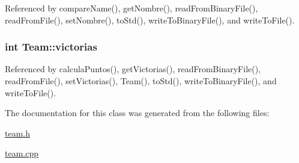Referenced by compare\+Name(), get\+Nombre(), read\+From\+Binary\+File(), read\+From\+File(), set\+Nombre(), to\+Std(), write\+To\+Binary\+File(), and write\+To\+File().

\hypertarget{class_team_ab6444e3430b98ec88a91a841ee7788d8}{}
\subsubsection[{victorias}]{\setlength{\rightskip}{0pt plus 5cm}int Team\+::victorias\hspace{0.3cm}{\ttfamily [private]}}\label{class_team_ab6444e3430b98ec88a91a841ee7788d8}


Referenced by calcula\+Puntos(), get\+Victorias(), read\+From\+Binary\+File(), read\+From\+File(), set\+Victorias(), Team(), to\+Std(), write\+To\+Binary\+File(), and write\+To\+File().



The documentation for this class was generated from the following files\+:\begin{DoxyCompactItemize}
\item 
\hyperlink{team_8h}{team.\+h}\item 
\hyperlink{team_8cpp}{team.\+cpp}\end{DoxyCompactItemize}
